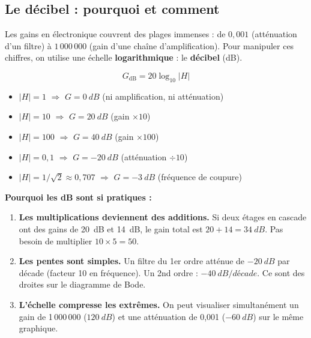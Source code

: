 \documentclass[12pt,a4paper,twoside]{book}
\begin{document}
\subsection{Le décibel : pourquoi et comment}

Les gains en électronique couvrent des plages immenses : de $0{,}001$ (atténuation d'un filtre) à $1\,000\,000$ (gain d'une chaîne d'amplification). Pour manipuler ces chiffres, on utilise une échelle \textbf{logarithmique} : le \textbf{décibel} (dB).

\begin{formule}
\[
\boxed{G_{\text{dB}} = 20\log_{10}|H|}
\]
\begin{itemize}[nosep]
\item $|H| = 1$ $\Rightarrow$ $G = \SI{0}{dB}$ (ni amplification, ni atténuation)
\item $|H| = 10$ $\Rightarrow$ $G = \SI{+20}{dB}$ (gain $\times 10$)
\item $|H| = 100$ $\Rightarrow$ $G = \SI{+40}{dB}$ (gain $\times 100$)
\item $|H| = 0{,}1$ $\Rightarrow$ $G = \SI{-20}{dB}$ (atténuation $\div 10$)
\item $|H| = 1/\sqrt{2} \approx 0{,}707$ $\Rightarrow$ $G = \SI{-3}{dB}$ (fréquence de coupure)
\end{itemize}
\end{formule}

\begin{intuition}
\textbf{Pourquoi les dB sont si pratiques :}
\begin{enumerate}[nosep]
\item \textbf{Les multiplications deviennent des additions.} Si deux étages en cascade ont des gains de \SI{20}{dB} et \SI{14}{dB}, le gain total est $20+14 = \SI{34}{dB}$. Pas besoin de multiplier $10 \times 5 = 50$.
\item \textbf{Les pentes sont simples.} Un filtre du 1er ordre atténue de $-\SI{20}{dB}$ par décade (facteur 10 en fréquence). Un 2nd ordre : $-\SI{40}{dB/décade}$. Ce sont des droites sur le diagramme de Bode.
\item \textbf{L'échelle compresse les extrêmes.} On peut visualiser simultanément un gain de 1\,000\,000 ($\SI{120}{dB}$) et une atténuation de 0,001 ($\SI{-60}{dB}$) sur le même graphique.
\end{enumerate}
\end{intuition}
\end{document}
